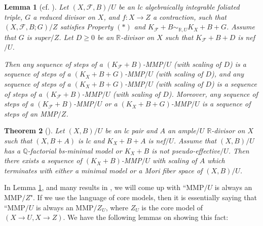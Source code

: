 \documentclass[11pt]{amsart}
\numberwithin{equation}{section}
\newcommand{\Qq}{\mathbb{Q}}
\newcommand{\Rr}{\mathbb{R}}
\newcommand{\Ff}{\mathcal{F}}
\newtheorem{thm}{Theorem}[section]
\newtheorem{lem}[thm]{Lemma}
\theoremstyle{definition}
\theoremstyle{definition}
\theoremstyle{definition}
\begin{document}
\begin{lem}[{cf. \cite[Lemma 9.2.1]{CHLX23}}]\label{lem: chlx 9.2.1}
    Let $(X,\Ff,B)/U$ be an lc algebraically integrable foliated triple, $G$ a reduced divisor on $X$, and $f: X\rightarrow Z$ a contraction, such that $(X,\Ff,B;G)/Z$ satisfies Property $(*)$ and $K_{\Ff}+B\sim_{\mathbb R,U}K_X+B+G$. Assume that $G$ is super$/Z$. Let $D\geq 0$ be an $\Rr$-divisor on $X$ such that $K_{\Ff}+B+D$ is nef$/U$.
    
    Then any sequence of steps of a $(K_{\Ff}+B)$-MMP$/U$ (with scaling of $D$) is a sequence of steps of a $(K_{X}+B+G)$-MMP$/U$ (with scaling of $D$), and any sequence of steps of a $(K_{X}+B+G)$-MMP$/U$ (with scaling of $D$) is a sequence of steps of a  $(K_{\Ff}+B)$-MMP$/U$ (with scaling of $D$). Moreover, any sequence of steps of a $(K_{\Ff}+B)$-MMP$/U$ or a 
 $(K_{X}+B+G)$-MMP$/U$ is a sequence of steps of an MMP$/Z$.
\end{lem}

\begin{thm}[{\cite[Theorem 1.7]{HH20}}]\label{thm: hh20 1.7}
    Let $(X,B)/U$ be an lc pair and $A$ an ample$/U$ $\Rr$-divisor on $X$ such that $(X,B+A)$ is lc and $K_X+B+A$ is nef$/U$. Assume that $(X,B)/U$ has a $\Qq$-factorial bs-minimal model or $K_X+B$ is not pseudo-effective$/U$. Then there exists a sequence of $(K_X+B)$-MMP$/U$ with scaling of $A$ which terminates with either a minimal model or a Mori fiber space of $(X,B)/U$. 
\end{thm}


In Lemma \ref{lem: chlx 9.2.1}, and many results in \cite{CHLX23}, we will come up with ``MMP$/U$ is always an MMP$/Z$". If we use the language of core models, then it is essentially saying that ``MMP$/U$ is always an MMP$/Z_U$, where $Z_U$ is the core model of $(X\rightarrow U,X\rightarrow Z)$. We have the following lemmas on showing this fact:
\end{document}
